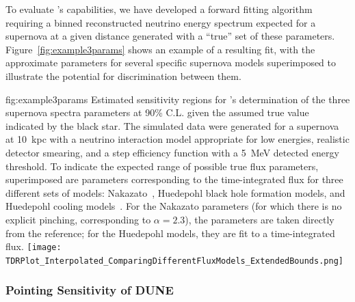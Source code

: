 To evaluate 's capabilities, we have developed a
forward fitting algorithm requiring a binned reconstructed 
neutrino energy spectrum expected for 
a supernova at a given distance generated with a ``true'' set of
these parameters. %
Figure~\ref{fig:example3params} shows an example of a resulting fit,
with the approximate parameters for several specific supernova models
superimposed to illustrate the potential for discrimination 
between them.


\begin{dunefigure}{fig:example3params}{%
    Estimated sensitivity regions for 's determination of the three supernova spectra parameters at 90\% C.L. given the assumed true value indicated by the black star.  The simulated data were generated for a supernova at \SI{10}{kpc}
    with a neutrino interaction model appropriate for low energies, 
    realistic detector smearing, and a step efficiency function with a \SI{5}{\MeV}
    detected energy threshold. To indicate the expected range of possible true flux parameters, superimposed are parameters corresponding to the time-integrated flux for three different sets of models:
  Nakazato~\cite{Nakazato:2012qf}, Huedepohl black hole formation models, and Huedepohl
  cooling models~\cite{huedepohldb}.  For the Nakazato parameters (for which there is no
  explicit pinching, corresponding to $\alpha=2.3$), the parameters are
  taken directly from the reference; for the Huedepohl models, they are fit to a
  time-integrated flux.}
	\texttt{[image: TDRPlot\_Interpolated\_ComparingDifferentFluxModels\_ExtendedBounds.png]}
  \end{dunefigure}

\subsubsection{Pointing Sensitivity of DUNE}

